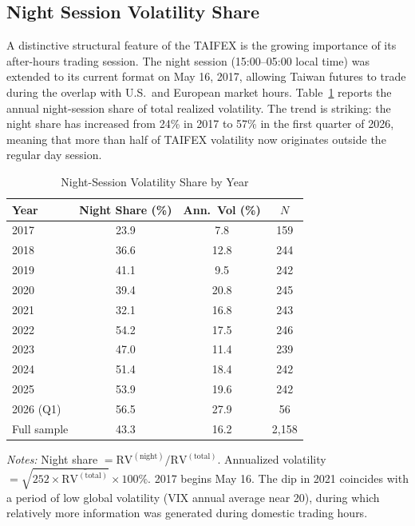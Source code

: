 \subsection{Night Session Volatility Share}
\label{sec:hf_night}

A distinctive structural feature of the TAIFEX is the growing importance of its after-hours trading session. The night session (15:00--05:00 local time) was extended to its current format on May 16, 2017, allowing Taiwan futures to trade during the overlap with U.S.\ and European market hours. Table~\ref{tab:night_share} reports the annual night-session share of total realized volatility. The trend is striking: the night share has increased from 24\% in 2017 to 57\% in the first quarter of 2026, meaning that more than half of TAIFEX volatility now originates outside the regular day session.

\begin{table}[H]
\centering
\caption{Night-Session Volatility Share by Year}
\label{tab:night_share}
\begin{tabular}{lccc}
\toprule
Year & Night Share (\%) & Ann.\ Vol (\%) & $N$ \\
\midrule
2017 & 23.9 & 7.8 & 159 \\
2018 & 36.6 & 12.8 & 244 \\
2019 & 41.1 & 9.5 & 242 \\
2020 & 39.4 & 20.8 & 245 \\
2021 & 32.1 & 16.8 & 243 \\
2022 & 54.2 & 17.5 & 246 \\
2023 & 47.0 & 11.4 & 239 \\
2024 & 51.4 & 18.4 & 242 \\
2025 & 53.9 & 19.6 & 242 \\
2026 (Q1) & 56.5 & 27.9 & 56 \\
\midrule
Full sample & 43.3 & 16.2 & 2,158 \\
\bottomrule
\end{tabular}
\begin{flushleft}
\small \textit{Notes:} Night share $= \text{RV}^{(\text{night})}/\text{RV}^{(\text{total})}$. Annualized volatility $= \sqrt{252 \times \overline{\text{RV}^{(\text{total})}}} \times 100\%$. 2017 begins May 16. The dip in 2021 coincides with a period of low global volatility (VIX annual average near 20), during which relatively more information was generated during domestic trading hours.
\end{flushleft}
\end{table}

